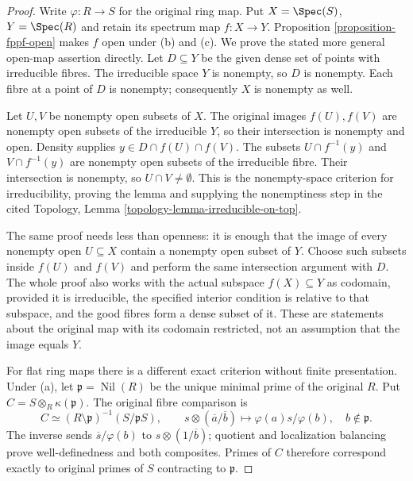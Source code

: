 \begin{proof}
Write $\varphi:R\to S$ for the original
ring map. Put $X=\Spec(S)$, $Y=\Spec(R)$
and retain its spectrum map $f:X\to Y$. Proposition
\ref{proposition-fppf-open} makes $f$ open
under (b) and (c). We prove the stated
more general open-map assertion directly.
Let $D\subseteq Y$ be the given dense
set of points with irreducible fibres.
The irreducible space $Y$ is nonempty,
so $D$ is nonempty. Each fibre at a
point of $D$ is nonempty; consequently
$X$ is nonempty as well.

Let $U,V$ be nonempty open subsets of
$X$. The original images $f(U),f(V)$
are nonempty open subsets of the
irreducible $Y$, so their intersection
is nonempty and open. Density supplies
$y\in D\cap f(U)\cap f(V)$.
The subsets $U\cap f^{-1}(y)$ and
$V\cap f^{-1}(y)$ are nonempty open
subsets of the irreducible fibre.
Their intersection is nonempty,
so $U\cap V\neq\emptyset$.
This is the nonempty-space criterion
for irreducibility, proving the lemma
and supplying the nonemptiness step
in the cited Topology, Lemma
\ref{topology-lemma-irreducible-on-top}.

The same proof needs less than
openness: it is enough that the
image of every nonempty open
$U\subseteq X$ contain a nonempty
open subset of $Y$. Choose such
subsets inside $f(U)$ and $f(V)$
and perform the same intersection
argument with $D$. The whole proof
also works with the actual subspace
$f(X)\subseteq Y$ as codomain,
provided it is irreducible, the
specified interior condition is
relative to that subspace, and
the good fibres form a dense
subset of it. These are statements
about the original map with its
codomain restricted, not an
assumption that the image equals $Y$.

For flat ring maps there is a
different exact criterion without
finite presentation. Under (a),
let $\mathfrak p=\operatorname{Nil}(R)$
be the unique minimal prime of
the original $R$. Put
$C=S\otimes_R\kappa(\mathfrak p)$.
The original fibre comparison is
$$
C\simeq(R\setminus\mathfrak p)^{-1}(S/\mathfrak pS),
\qquad
s\otimes(\overline a/\overline b)
\longmapsto\varphi(a)s/\varphi(b),
\quad b\notin\mathfrak p.
$$
The inverse sends $\overline s/\varphi(b)$
to $s\otimes(1/\overline b)$;
quotient and localization balancing
prove well-definedness and both
composites. Primes of $C$ therefore
correspond exactly to original
primes of $S$ contracting to
$\mathfrak p$.


\end{proof}
